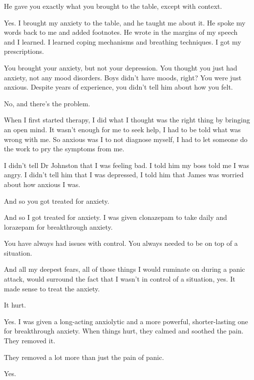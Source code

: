 \begin{ally}
He gave you exactly what you brought to the table, except with context.
\end{ally}
Yes. I brought my anxiety to the table, and he taught me about it. He spoke my words back to me and added footnotes. He wrote in the margins of my speech and I learned. I learned coping mechanisms and breathing techniques. I got my prescriptions.

\begin{ally}
You brought your anxiety, but not your depression. You thought you just had anxiety, not any mood disorders. Boys didn't have moods, right? You were just anxious. Despite years of experience, you didn't tell him about how you felt.
\end{ally}
No, and there's the problem.
\newpage

When I first started therapy, I did what I thought was the right thing by bringing an open mind. It wasn't enough for me to seek help, I had to be told what was wrong with me. So anxious was I to not diagnose myself, I had to let someone do the work to pry the symptoms from me.

I didn't tell Dr Johnston that I was feeling bad. I told him my boss told me I was angry. I didn't tell him that I was depressed, I told him that James was worried about how anxious I was.

\begin{ally}
And so you got treated for anxiety.
\end{ally}
And so I got treated for anxiety. I was given clonazepam to take daily and lorazepam for breakthrough anxiety.

\begin{ally}
You have always had issues with control. You always needed to be on top of a situation.
\end{ally}
And all my deepest fears, all of those things I would ruminate on during a panic attack, would surround the fact that I wasn't in control of a situation, yes. It made sense to treat the anxiety.

\begin{ally}
It hurt.
\end{ally}
Yes. I was given a long-acting anxiolytic and a more powerful, shorter-lasting one for breakthrough anxiety. When things hurt, they calmed and soothed the pain. They removed it.

\begin{ally}
They removed a lot more than just the pain of panic.
\end{ally}
Yes.
\newpage

